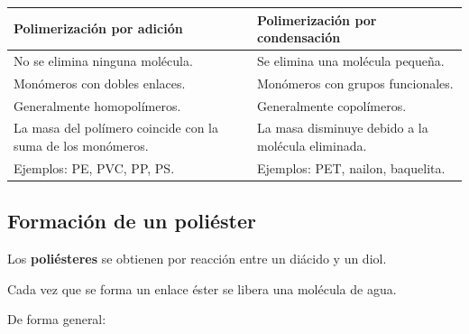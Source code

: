 \begin{center}

\renewcommand{\arraystretch}{1.3}

\begin{tabular}{p{5cm}p{5cm}}

\toprule

\textbf{Polimerización por adición} &
\textbf{Polimerización por condensación}

\\

\midrule

No se elimina ninguna molécula.

&
Se elimina una molécula pequeña.

\\

Monómeros con dobles enlaces.

&
Monómeros con grupos funcionales.

\\

Generalmente homopolímeros.

&
Generalmente copolímeros.

\\

La masa del polímero coincide con la suma de los monómeros.

&
La masa disminuye debido a la molécula eliminada.

\\

Ejemplos: PE, PVC, PP, PS.

&
Ejemplos: PET, nailon, baquelita.

\\

\bottomrule

\end{tabular}

\end{center}


\subsection{Formación de un poliéster}

Los \textbf{poliésteres} se obtienen por reacción entre un diácido y un diol.

Cada vez que se forma un enlace éster se libera una molécula de agua.

De forma general:

